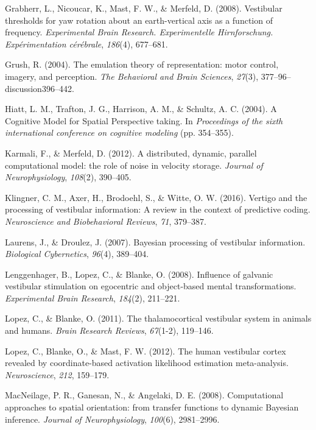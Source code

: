 \documentclass[english,floatsintext,man]{apa6}
\theoremstyle{definition}
\theoremstyle{definition}
\theoremstyle{remark}
\begin{document}
\hypertarget{ref-Grabherr:2008kk}{}
Grabherr, L., Nicoucar, K., Mast, F. W., \& Merfeld, D. (2008).
Vestibular thresholds for yaw rotation about an earth-vertical axis as a
function of frequency. \emph{Experimental Brain Research. Experimentelle
Hirnforschung. Expérimentation cérébrale}, \emph{186}(4), 677--681.

\hypertarget{ref-Grush:2004wx}{}
Grush, R. (2004). The emulation theory of representation: motor control,
imagery, and perception. \emph{The Behavioral and Brain Sciences},
\emph{27}(3), 377--96--discussion396--442.

\hypertarget{ref-Hiatt:2004tv}{}
Hiatt, L. M., Trafton, J. G., Harrison, A. M., \& Schultz, A. C. (2004).
A Cognitive Model for Spatial Perspective taking. In \emph{Proceedings
of the sixth international conference on cognitive modeling} (pp.
354--355).

\hypertarget{ref-Karmali:2012cv}{}
Karmali, F., \& Merfeld, D. (2012). A distributed, dynamic, parallel
computational model: the role of noise in velocity storage.
\emph{Journal of Neurophysiology}, \emph{108}(2), 390--405.

\hypertarget{ref-Klingner:2016ia}{}
Klingner, C. M., Axer, H., Brodoehl, S., \& Witte, O. W. (2016). Vertigo
and the processing of vestibular information: A review in the context of
predictive coding. \emph{Neuroscience and Biobehavioral Reviews},
\emph{71}, 379--387.

\hypertarget{ref-Laurens:2006be}{}
Laurens, J., \& Droulez, J. (2007). Bayesian processing of vestibular
information. \emph{Biological Cybernetics}, \emph{96}(4), 389--404.

\hypertarget{ref-Lenggenhager:2008et}{}
Lenggenhager, B., Lopez, C., \& Blanke, O. (2008). Influence of galvanic
vestibular stimulation on egocentric and object-based mental
transformations. \emph{Experimental Brain Research}, \emph{184}(2),
211--221.

\hypertarget{ref-Lopez:2011cc}{}
Lopez, C., \& Blanke, O. (2011). The thalamocortical vestibular system
in animals and humans. \emph{Brain Research Reviews}, \emph{67}(1-2),
119--146.

\hypertarget{ref-Lopez:2012ek}{}
Lopez, C., Blanke, O., \& Mast, F. W. (2012). The human vestibular
cortex revealed by coordinate-based activation likelihood estimation
meta-analysis. \emph{Neuroscience}, \emph{212}, 159--179.

\hypertarget{ref-PaulRMacNeilage:2008bv}{}
MacNeilage, P. R., Ganesan, N., \& Angelaki, D. E. (2008). Computational
approaches to spatial orientation: from transfer functions to dynamic
Bayesian inference. \emph{Journal of Neurophysiology}, \emph{100}(6),
2981--2996.
\end{document}

